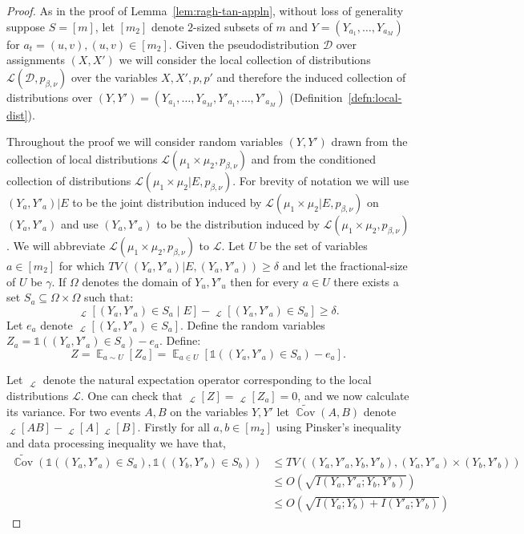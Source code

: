 \documentclass[11pt]{article}
\DeclareMathOperator*{\E}{\mathbb{E}}
\DeclareMathOperator*{\pE}{\widetilde{\mathbb{E}}}
\DeclareMathOperator*{\pPr}{\widetilde{\Pr}}
\DeclareMathOperator*{\Cov}{\mathbb{C}ov}
\def \cD {\mathcal{D}}
\def \cL {\mathcal{L}}
\def \one {\mathbb{1}}
\def \pCov {\widetilde{\Cov}}
\theoremstyle{definition}
\begin{document}
\begin{proof}
As in the proof of Lemma~\ref{lem:ragh-tan-appln}, without loss of generality suppose $S = [m]$, let $[m_2]$ denote $2$-sized subsets of $m$ and $Y = (Y_{a_1},\ldots,Y_{a_M})$ for $a_t = (u,v), (u,v) \in [m_2]$. Given the pseudodistribution $\cD$ over assignments $(X,X')$ we will consider the local collection of distributions $\cL(\cD, p_{\beta,\nu})$ over the variables $X,X',p,p'$ and therefore the induced collection of distributions over $(Y,Y') = (Y_{a_1},\ldots,Y_{a_M},Y'_{a_1},\ldots,Y'_{a_M})$ (Definition~\ref{defn:local-dist}).

Throughout the proof we will consider random variables $(Y,Y')$ drawn from the collection of local distributions $\cL(\mu_1 \times \mu_2,p_{\beta,\nu})$ and from the conditioned collection of distributions $\cL(\mu_1 \times \mu_2 | E,p_{\beta,\nu})$. For brevity of notation we will use $(Y_a,Y'_a)|E$ to be the joint distribution induced by $\cL(\mu_1 \times \mu_2 | E, p_{\beta,\nu})$ on $(Y_a,Y'_a)$ and use $(Y_a,Y'_a)$ to be the distribution induced by $\cL(\mu_1 \times \mu_2,p_{\beta,\nu})$. We will abbreviate $\cL(\mu_1 \times \mu_2,p_{\beta,\nu})$ to $\cL$. Let $U$ be the set of variables $a \in [m_2]$ for which $TV((Y_a,Y'_a)|E , (Y_a,Y'_a)) \geq \delta$ and let the fractional-size of $U$ be $\gamma$. If $\Omega$ denotes the domain of $Y_u, Y'_u$ then for every $a \in U$ there exists a set $S_a \subseteq \Omega \times \Omega$ such that: 
\begin{equation}\label{eq:e-tv}
\pPr_{\cL}[(Y_a,Y'_a) \in S_a \mid E] - \pPr_{\cL}[(Y_a,Y'_a) \in S_a] \geq \delta.
\end{equation}
Let $e_a$ denote  $\pPr_{\cL}[(Y_a,Y'_a) \in S_a]$. Define the random variables $Z_a = \one((Y_a,Y'_a) \in S_a) - e_a$. Define:
\[Z = \E_{a \sim U}[Z_a] = \E_{a \in U}[\one((Y_a,Y'_a) \in S_a) - e_a].\]

Let $\pE_{\cL}$ denote the natural expectation operator corresponding to the local distributions $\cL$. 
One can check that $\pE_{\cL}[Z] = \pE_{\cL}[Z_a] = 0$, and we now calculate its variance. For two events $A,B$ on the variables $Y,Y'$ let $\pCov(A,B)$ denote $\pE_{\cL}[AB] - \pE_{\cL}[A]\pE_{\cL}[B]$. Firstly for all $a,b \in [m_2]$  using Pinsker's inequality and data processing inequality we have that,
\begin{align*}
\pCov(\one((Y_a,Y'_a) \in S_a),\one((Y_b,Y'_b) \in S_b)) 
&\leq TV((Y_a,Y'_a,Y_b,Y'_b), (Y_a,Y'_a)\times (Y_b,Y'_b)) \\ &\leq O(\sqrt{I(Y_a,Y'_a;Y_b,Y'_b)}) \\
&\leq O(\sqrt{I(Y_a;Y_b) + I(Y'_a;Y'_b)})
\end{align*}


\end{proof}
\end{document}
